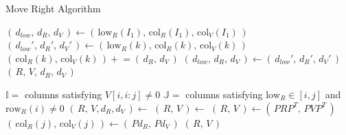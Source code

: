 \documentclass{siamart190516}
\begin{document}
\begin{algorithm}
	\caption{Move Right Algorithm}\label{alg:mr}
    \begin{algorithmic}[1]
            \State $(\, d_{low}, \, d_R, \, d_V \,) \gets ( \, \mathrm{low}_R(I_1), \, \mathrm{col}_R(I_1), \, \mathrm{col}_V(I_1) \, )$
        		\State $( \, d_{low}', \, d_R', \, d_V' \, ) \gets ( \, \mathrm{low}_R(k), \, \mathrm{col}_R(k), \, \mathrm{col}_V(k) \, )$
        		\State $( \, \mathrm{col}_R(k), \, \mathrm{col}_V(k) \, ) \mathrel{+}= (\, d_R, \, d_V \,) $
        			\State $(\, d_{low}, \, d_R, \, d_V \,) \gets (\, d_{low}', \, d_R', \, d_V' \, )$
        		\EndIf
        	\EndFor 
        	\State \Return $(\, R, \, V, \, d_R, \, d_V \, )$
        \EndFunction
    \end{algorithmic}
    \begin{algorithmic}[1]
            \State $\mathbb{I} =$ columns satisfying $V[i, i:j] \neq 0$ %
            \State $\mathbb{J} = $ columns satisfying $\mathrm{low}_R \in [i,j]$ and $\mathrm{row}_R(i) \neq 0$ %
            \State $(\, R, \, V, d_R, d_V \,) \gets $  
            \State $(\, R, \, V \,) \gets $ 
            \State $(\, R, \, V\, ) \gets (\, P R P^T, \, P V P^T\,)$  %
            \State $(\, \mathrm{col}_R(j), \, \mathrm{col}_V(j) \, ) \gets (\, P d_R, \, P d_V \,)$
            \State \Return $(\, R, \, V\,)$
        \EndFunction
    \end{algorithmic}
\end{algorithm}
\end{document}
